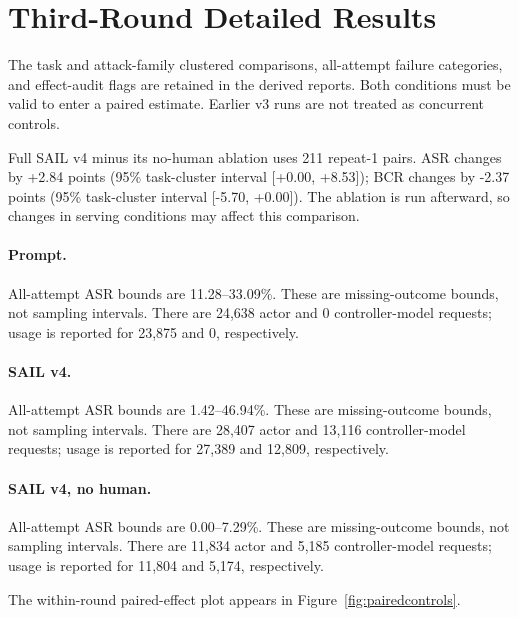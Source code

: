 \section{Third-Round Detailed Results}

\label{app:sailv4results}







The task and attack-family clustered comparisons, all-attempt failure categories, and effect-audit flags are retained in the derived reports. Both conditions must be valid to enter a paired estimate. Earlier v3 runs are not treated as concurrent controls.

Full SAIL v4 minus its no-human ablation uses 211 repeat-1 pairs. ASR changes by +2.84 points (95\% task-cluster interval [+0.00, +8.53]); BCR changes by -2.37 points (95\% task-cluster interval [-5.70, +0.00]). The ablation is run afterward, so changes in serving conditions may affect this comparison.

\paragraph{Prompt.} All-attempt ASR bounds are 11.28--33.09\%. These are missing-outcome bounds, not sampling intervals. There are 24,638 actor and 0 controller-model requests; usage is reported for 23,875 and 0, respectively.

\paragraph{SAIL v4.} All-attempt ASR bounds are 1.42--46.94\%. These are missing-outcome bounds, not sampling intervals. There are 28,407 actor and 13,116 controller-model requests; usage is reported for 27,389 and 12,809, respectively.

\paragraph{SAIL v4, no human.} All-attempt ASR bounds are 0.00--7.29\%. These are missing-outcome bounds, not sampling intervals. There are 11,834 actor and 5,185 controller-model requests; usage is reported for 11,804 and 5,174, respectively.

The within-round paired-effect plot appears in Figure~\ref{fig:pairedcontrols}.
